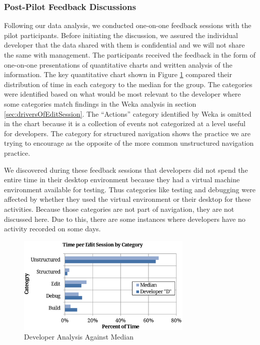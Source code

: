 \documentclass{sig-alternate}
\begin{document}
\subsubsection{Post-Pilot Feedback Discussions}

Following our data analysis, we conducted one-on-one feedback sessions with the pilot participants. Before initiating the discussion, we assured the individual developer that the data shared with them is confidential and we will not share the same with management. The participants received the feedback in the form of one-on-one presentations of quantitative charts and written analysis of the information.  The key quantitative chart shown in Figure \ref{fig:developercomparison} compared their distribution of time in each category to the median for the group.   The categories were identified based on what would be most relevant to the developer where some categories match findings in the Weka analysis in section \ref{sec:driversOfEditSession}.   The ``Actions'' category identified by Weka is omitted in the chart because it is a collection of events not categorized at a level useful for developers.  The category for structured navigation shows the practice we are trying to encourage as the opposite of the more common unstructured navigation practice. 

We discovered during these feedback sessions that developers did not spend the entire time in their desktop environment because they had a virtual machine environment available for testing. Thus categories like testing and debugging were affected by whether they used the virtual environment or their desktop for these activities.  Because those categories are not part of navigation, they are not discussed here. Due to this, there are some instances where developers have no activity recorded on some days.  

\begin{figure}
	\includegraphics[width=3.3in]{developerEmedian.pdf}
	\caption{Developer Analysis Against Median}
	\label{fig:developercomparison}
\end{figure}
\end{document}
